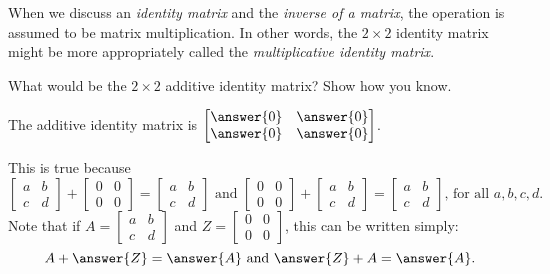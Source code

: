 \documentclass[space,nooutcomes]{ximera}
\begin{document}
When we discuss an \emph{identity matrix} and the \emph{inverse of a
  matrix}, the operation is assumed to be matrix multiplication.  In
other words, the $2\times 2$ identity matrix might be more
appropriately called the \emph{multiplicative identity matrix}.

\begin{question}
What would be the $2\times 2$ additive identity matrix?  Show how you
know.
\begin{solution}
The additive identity matrix is $\begin{bmatrix} \answer{0}&\answer{0} \\ \answer{0}&\answer{0} \end{bmatrix}$.  

\begin{question}
This is true because 
\[
\begin{bmatrix} a&b \\ c&d \end{bmatrix} + \begin{bmatrix} 0&0 \\ 0&0 \end{bmatrix} = 
\begin{bmatrix} a&b \\ c&d \end{bmatrix}
\text{ and }
\begin{bmatrix} 0&0 \\ 0&0 \end{bmatrix} + \begin{bmatrix} a&b \\ c&d \end{bmatrix} = 
\begin{bmatrix} a&b \\ c&d \end{bmatrix}\text{, for all }a, b, c, d.  
\]
Note that if $A = \begin{bmatrix} a&b \\ c&d \end{bmatrix}$ and $Z = \begin{bmatrix} 0&0 \\ 0&0 \end{bmatrix}$, this can be written simply:  
\[
A + \answer{Z} = \answer{A}\text{ and }\answer{Z}+A = \answer{A}.
\]
\end{question}
\end{solution}
\end{question}
\end{document}
